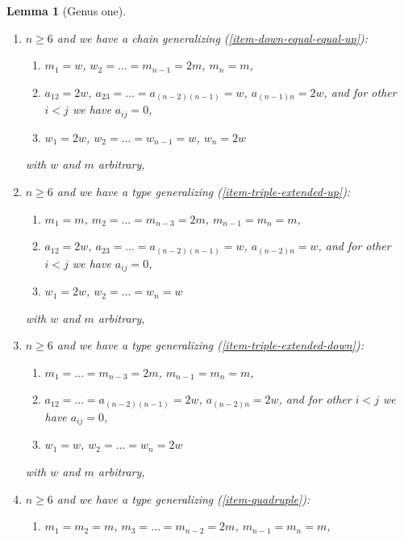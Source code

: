 \documentclass{stacks-project}
\theoremstyle{plain}
\newtheorem{lemma}[subsection]{Lemma}
\theoremstyle{definition}
\theoremstyle{remark}
\numberwithin{equation}{subsection}
\begin{document}
\begin{lemma}[Genus one]
\begin{enumerate}
\begin{enumerate}
\item $a_{12} = \ldots = a_{(n - 1) n} = w$,
and for other $i < j$ we have $a_{ij} = 0$,
\item $w_1 = w$, $w_2 = \ldots = w_{n - 1} = 2w$, $w_n = w$
\end{enumerate}
with $w$ and $m$ arbitrary,
\item
\label{item-down-chain-equal-up}
$n \geq 6$ and we have a chain generalizing (\ref{item-down-equal-equal-up}):
\begin{enumerate}
\item $m_1 = w$, $w_2 = \ldots = m_{n - 1} = 2m$, $m_n = m$,
\item $a_{12} = 2w$, $a_{23} = \ldots = a_{(n - 2) (n - 1)} = w$,
$a_{(n - 1) n} = 2w$, and for other $i < j$ we have $a_{ij} = 0$,
\item $w_1 = 2w$, $w_2 = \ldots = w_{n - 1} = w$, $w_n = 2w$
\end{enumerate}
with $w$ and $m$ arbitrary,
\item
\label{item-Dn-extended-up}
$n \geq 6$ and we have a type generalizing (\ref{item-triple-extended-up}):
\begin{enumerate}
\item $m_1 = m$, $m_2 = \ldots = m_{n - 3} = 2m$, $m_{n - 1} = m_n = m$,
\item $a_{12} = 2w$, $a_{23} = \ldots = a_{(n - 2) (n - 1)} = w$,
$a_{(n - 2) n} = w$, and for other $i < j$ we have $a_{ij} = 0$,
\item $w_1 = 2w$, $w_2 = \ldots = w_n = w$
\end{enumerate}
with $w$ and $m$ arbitrary,
\item
\label{item-Dn-extended-down}
$n \geq 6$ and we have a type generalizing (\ref{item-triple-extended-down}):
\begin{enumerate}
\item $m_1 = \ldots = m_{n - 3} = 2m$, $m_{n - 1} = m_n = m$,
\item $a_{12} = \ldots = a_{(n - 2) (n - 1)} = 2w$,
$a_{(n - 2) n} = 2w$, and for other $i < j$ we have $a_{ij} = 0$,
\item $w_1 = w$, $w_2 = \ldots = w_n = 2w$
\end{enumerate}
with $w$ and $m$ arbitrary,
\item
\label{item-double-triple}
$n \geq 6$ and we have a type generalizing (\ref{item-quadruple}):
\begin{enumerate}
\item $m_1 = m_2 = m$, $m_3 = \ldots = m_{n - 2} = 2m$, $m_{n - 1} = m_n = m$,

\end{enumerate}
\end{enumerate}
\end{lemma}
\end{document}
